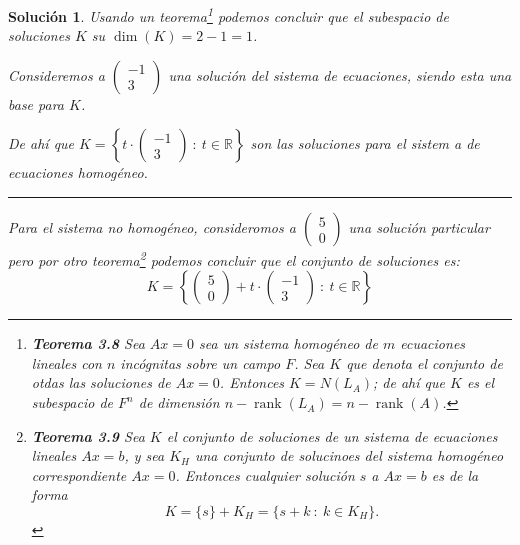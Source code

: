 \documentclass[letterpaper]{article}
\newcommand{\R}{\mathbb{R}}
\DeclareMathOperator{\rank}{rank}
\newtheorem*{sol}{Solución}
\begin{document}
\begin{enumerate}
\begin{enumerate}[label=(\alph*)]
\begin{sol}
    Usando un teorema\footnote{
        \textbf{Teorema 3.8} \emph{Sea $Ax = 0$ sea un sistema homogéneo de $m$ ecuaciones lineales con $n$ incógnitas
        sobre un campo $F$. Sea $K$ que denota el conjunto de otdas las soluciones de $Ax = 0$. Entonces $K = N(L_A)$;
        de ahí que $K$ es el subespacio de $F^n$ de dimensión $n -  \rank(L_A) = n - \rank(A)$.}
    } podemos concluir que el subespacio de soluciones $K$ su $\dim(K) = 2 - 1 = 1$.

    Consideremos a $
    \begin{pmatrix}
        -1\\
        3
    \end{pmatrix}$ una solución del sistema de ecuaciones, siendo esta una base para $K$.

    De ahí que $K = \left\{
        t \cdot
        \begin{pmatrix}
            -1\\
            3
        \end{pmatrix} \: : \: t \in \R
    \right\}$ son las soluciones para el sistem a de ecuaciones homogéneo.

    \noindent \rule{\linewidth}{0.2mm}

    Para el sistema no homogéneo, consideromos a $\begin{pmatrix}
        5\\
        0
    \end{pmatrix}$ una solución particular pero por otro teorema\footnote{
        \textbf{Teorema 3.9} \emph{Sea $K$ el conjunto de soluciones de un sistema de ecuaciones lineales $Ax = b$},
        y sea $K_H$ una conjunto de solucinoes del sistema homogéneo correspondiente $Ax = 0$. Entonces cualquier
        solución $s$ a $Ax = b$ es de la forma
        $$ K = \{ s \} + K_H = \{ s + k \: : \: k \in K_H \}. $$
    }
    podemos concluir que el conjunto de soluciones es:
    \[
        K = \left\{
        \begin{pmatrix}
            5\\
            0
        \end{pmatrix} +
        t \cdot
        \begin{pmatrix}
            -1\\
            3
        \end{pmatrix}
        \: : \: t \in \R
        \right\}
    \]

    \end{sol}


\end{enumerate}
\end{enumerate}
\end{document}
